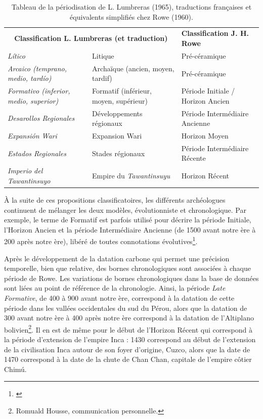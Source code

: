 \begin{table}[!h]
   \centering
    \begin{tabular}{|p{}|p{}|p{}|}
         \cline{1-3}
         \multicolumn{2}{|c|}{ \textbf{Classification L. Lumbreras (et traduction)}} & \textbf{Classification J. H. Rowe} \\ [1ex]  \cline{1-3}
         \textit{Lítico} &  Litique & Pré-céramique \\ [1ex]\hline
          \textit{Arcaico (temprano, medio, tardío)} & Archaïque (ancien, moyen, tardif) & Pré-céramique \\ \hline
          \textit{Formativo (inferior, medio, superior)} & Formatif (inférieur, moyen, supérieur) & Période Initiale / Horizon Ancien \\ \hline
          \textit{Desarollos Regionales} & Développements régionaux &  Période Intermédiaire Ancienne\\[1ex] \hline
          \textit{Expansión Wari} & Expansion Wari &  Horizon Moyen \\[1ex] \hline
          \textit{Estados Regionales} & Stades régionaux & Période Intermédiaire Récente \\ [1ex]\hline
          \textit{Imperio del Tawantinsuyo} & Empire du \textit{Tawantinsuyu} & Horizon Récent \\ [1ex]\hline
    \end{tabular} 
    \caption{\centering Tableau de la périodisation de L. Lumbreras (1965), traductions françaises et équivalents simplifiés chez Rowe (1960).}
    \label{tab:periods}
\end{table}  

\clearpage

À la suite de ces propositions classificatoires, les différents archéologues continuent de mélanger les deux modèles, évolutionniste et chronologique. Par exemple, le terme de Formatif est parfois utilisé pour décrire la période Initiale, l'Horizon Ancien et la période Intermédiaire Ancienne (de 1500 avant notre ère à 200 après notre ère), libéré de toutes connotations évolutives\footnote{\cite[p.~22]{ramonjoffrePeriodificacionArqueologiaPeruana2005}}. 

Après le développement de la datation carbone qui permet une précision temporelle, bien que relative, des bornes chronologiques sont associées à chaque période de Rowe. Les variations de bornes chronologiques dans la base de données sont liées au point de référence de la chronologie. Ainsi, la période \og \textit{Late Formative}\fg, de 400 à 900 avant notre ère, correspond à la datation de cette période dans les vallées occidentales du sud du Pérou, alors que la datation de 300 avant notre ère à 400 après notre ère correspond à la datation de l'Altiplano bolivien\footnote{Romuald Housse, communication personnelle.}. Il en est de même pour le début de l'Horizon Récent qui correspond à la période d'extension de l'empire Inca : 1430 correspond au début de l'extension de la civilisation Inca autour de son foyer d'origine, Cuzco, alors que la date de 1470 correspond à la date de la chute de Chan Chan, capitale de l'empire côtier Chimú. 

